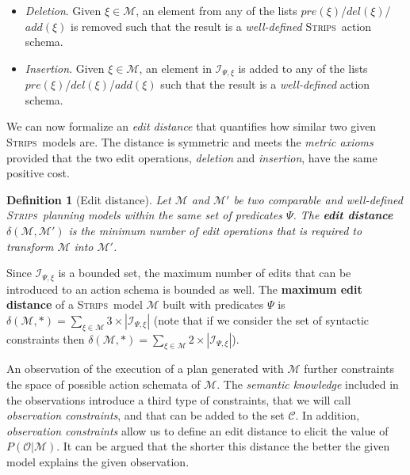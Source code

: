 \documentclass[letterpaper]{article} %
\newcommand{\strips}{\textsc{Strips}}     %
\newtheorem{definition}[theorem]{Definition}
\begin{document}
\begin{itemize}
\item {\em Deletion}. Given $\xi\in\mathcal{M}$, an element from any of the lists $pre(\xi)$/$del(\xi)$/$add(\xi)$ is removed such that the result is a {\em well-defined} \strips\ action schema.
\item {\em Insertion}. Given $\xi\in\mathcal{M}$, an element in ${\mathcal I}_{\Psi,\xi}$ is added to any of the lists $pre(\xi)$/$del(\xi)$/$add(\xi)$ such that the result is a {\em well-defined} action schema.
\end{itemize}

We can now formalize an {\em edit distance} that quantifies how similar two given \strips\ models are. The distance is symmetric and meets the {\em metric axioms} provided that the two edit operations, {\em deletion} and {\em insertion}, have the same positive cost.

\begin{definition}[Edit distance]
  Let $\mathcal{M}$ and $\mathcal{M}'$ be two {\em comparable} and {\em well-defined} \strips\ planning models within the same set of predicates $\Psi$. The {\bf edit distance} $\delta(\mathcal{M},\mathcal{M}')$ is the minimum number of {\em edit operations} that is required to transform $\mathcal{M}$ into $\mathcal{M}'$.
\end{definition}

Since ${\mathcal I}_{\Psi,\xi}$ is a bounded set, the maximum number of edits that can be introduced to an action schema is bounded as well. The \textbf{maximum edit distance} of a \strips\ model $\mathcal{M}$ built with predicates $\Psi$ is $\delta(\mathcal{M},*)=\sum_{\xi\in\mathcal{M}} 3\times|{\mathcal I}_{\Psi,\xi}|$ (note that if we consider the set of syntactic constraints then $\delta(\mathcal{M},*)=\sum_{\xi\in\mathcal{M}} 2\times|{\mathcal I}_{\Psi,\xi}|$).

\vspace{0.02cm}

An observation of the execution of a plan generated with $\mathcal{M}$ further constraints the space of possible action schemata of $\mathcal{M}$. The \emph{semantic knowledge} included in the observations introduce a third type of constraints, that we will call {\em observation constraints}, and that can be added to the set $\mathcal{C}$. In addition, {\em observation constraints} allow us to define an edit distance to elicit the value of $P(\mathcal{O}|\mathcal{M})$. It can be argued that the shorter this distance the better the given model explains the given observation.
\end{document}
